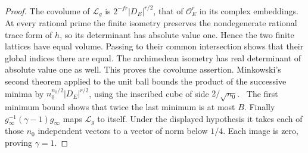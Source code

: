 \documentclass[a4paper,11pt]{article}
\theoremstyle{definition}
\theoremstyle{remark}
\numberwithin{equation}{section}
\newcommand{\OO}{\mathcal O}
\begin{document}
\begin{proof}
The covolume of \({\mathcal L}_g\) is
\(2^{-fr}|D_E|^{r/2}\), that of \(\OO_E^r\) in its complex
embeddings. At every rational prime the finite isometry preserves
the nondegenerate rational trace form of \(h\), so its determinant
has absolute value one. Hence the two finite lattices have equal
volume. Passing to their common intersection shows that their
global indices there are equal. The archimedean isometry has
real determinant of absolute value one as well. This proves the
covolume assertion. Minkowski's second theorem applied to the
unit ball bounds the product of the successive minima by
\(n_0^{n_0/2}|D_E|^{r/2}\), using the inscribed cube of side
\(2/\sqrt{n_0}\).~\cite[Thm.~6.3.3]{XXIII-XVIII-IV-minima32}
The first minimum bound shows that twice the last minimum is
at most \(B\). Finally \(g_\infty^{-1}(\gamma-1)g_\infty\)
maps \({\mathcal L}_g\) to itself. Under the displayed hypothesis
it takes each of those \(n_0\) independent vectors to a vector
of norm below \(1/4\). Each image is zero, proving \(\gamma=1\).
\end{proof}
\end{document}
